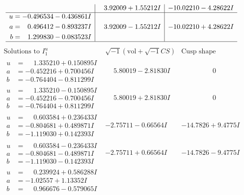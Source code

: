 \documentclass[1p]{elsarticle_modified}
\theoremstyle{definition}
\newcommand{\I}{\sqrt{-1}}
\begin{document}
$$\begin{array}{c|c|c}
 & \phantom{-}3.92009 + 1.55212 I & -10.02210 - 4.28622 I \\ \hline\begin{aligned}
u &= -0.496534 - 0.436861 I \\
a &= \phantom{-}0.496412 - 0.893237 I \\
b &= \phantom{-}1.299830 - 0.083523 I\end{aligned}
 & \phantom{-}3.92009 - 1.55212 I & -10.02210 + 4.28622 I\\
 \hline 
 \end{array}$$\newpage$$\begin{array}{c|c|c}  
\text{Solutions to }I^u_{1}& \I (\text{vol} + \sqrt{-1}CS) & \text{Cusp shape}\\
 \hline 
\begin{aligned}
u &= \phantom{-}1.335210 + 0.150895 I \\
a &= -0.452216 + 0.700456 I \\
b &= -0.764404 - 0.811299 I\end{aligned}
 & \phantom{-}5.80019 - 2.81830 I & \phantom{-0.000000 } 0 \\ \hline\begin{aligned}
u &= \phantom{-}1.335210 - 0.150895 I \\
a &= -0.452216 - 0.700456 I \\
b &= -0.764404 + 0.811299 I\end{aligned}
 & \phantom{-}5.80019 + 2.81830 I & \phantom{-0.000000 } 0 \\ \hline\begin{aligned}
u &= \phantom{-}0.603584 + 0.236433 I \\
a &= -0.804681 + 0.489871 I \\
b &= -1.119030 + 0.142393 I\end{aligned}
 & -2.75711 - 0.66564 I & -14.7826 + 9.4775 I \\ \hline\begin{aligned}
u &= \phantom{-}0.603584 - 0.236433 I \\
a &= -0.804681 - 0.489871 I \\
b &= -1.119030 - 0.142393 I\end{aligned}
 & -2.75711 + 0.66564 I & -14.7826 - 9.4775 I \\ \hline\begin{aligned}
u &= \phantom{-}0.239924 + 0.586288 I \\
a &= -1.02557 + 1.13352 I \\
b &= \phantom{-}0.966676 - 0.579065 I\end{aligned}

\end{array}$$
\end{document}
